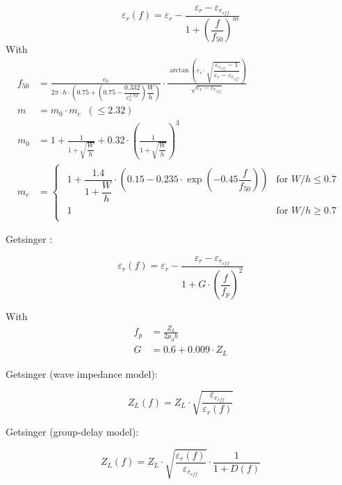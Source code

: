 \documentclass[10pt]{report}
\begin{document}
\begin{equation}
\varepsilon_{r}(f) = \varepsilon_{r} - \frac{\varepsilon_{r} - \varepsilon_{r_{eff}}}{1 + \left(\dfrac{f}{f_{50}}\right)^{m}}
\end{equation}
With
\begin{align}
f_{50} &= \frac{c_{0}}{2\pi\cdot h \cdot\left(0.75 + \left(0.75 - \dfrac{0.332}{\varepsilon_{r}^{1.73}}\right)\dfrac{W}{h}\right)} \cdot \frac{\arctan\left(\varepsilon_{r}\cdot\sqrt{\dfrac{\varepsilon_{r_{eff}} - 1}{\varepsilon_{r} - \varepsilon_{r_{eff}}}}\right)}{\sqrt{\varepsilon_{r} - \varepsilon_{r_{eff}}}}\\
m &= m_{0}\cdot m_{c} \;\; (\le 2.32)\\
m_{0} &= 1 + \frac{1}{1 + \sqrt{\dfrac{W}{h}}} + 0.32\cdot\left(\frac{1}{1 + \sqrt{\dfrac{W}{h}}}\right)^{3}\\
m_{c} &=
\begin{cases}
\begin{array}{ll}
1 + \dfrac{1.4}{1 + \dfrac{W}{h}}\cdot\left(0.15 - 0.235\cdot\exp\left(-0.45\dfrac{f}{f_{50}}\right)\right) & \mbox{for $W / h \le 0.7$} \\
1 & \mbox{for $W / h \ge 0.7$}
\end{array}
\end{cases}
\end{align}

Getsinger \cite{Getsinger}:

\begin{equation}
\varepsilon_{r}(f) = \varepsilon_{r} - \frac{\varepsilon_{r} - \varepsilon_{r_{eff}}}{1 + G\cdot \left(\dfrac{f}{f_{p}}\right)^{2}}
\end{equation}

With
\begin{align}
f_{p} &= \frac{Z_{L}}{2\mu_{0} h}\\
G &= 0.6 + 0.009\cdot Z_{L}
\end{align}

Getsinger \cite{Getsinger2} (wave impedance model):

\begin{equation}
Z_{L}(f) = Z_{L}\cdot\sqrt{\frac{\varepsilon_{r_{eff}}}{\varepsilon_{r}(f)}}
\end{equation}

Getsinger \cite{Getsinger3} (group-delay model):

\begin{equation}
Z_{L}(f) = Z_{L}\cdot\sqrt{\frac{\varepsilon_{r}(f)}{\varepsilon_{r_{eff}}}}\cdot\frac{1}{1 + D(f)}
\end{equation}
\end{document}
